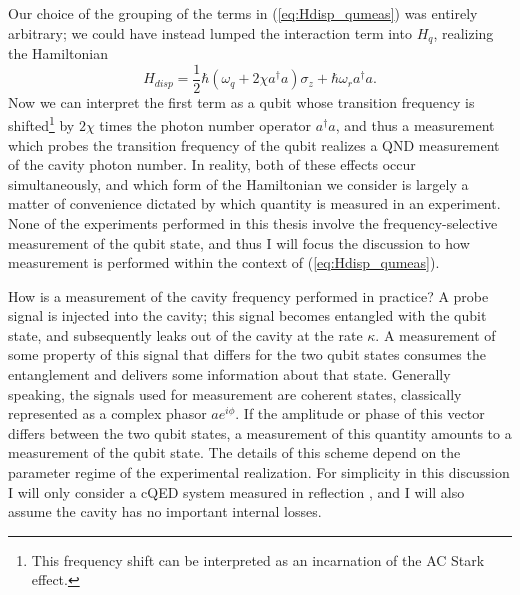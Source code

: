 Our choice of the grouping of the terms in (\ref{eq:Hdisp_qumeas}) was entirely arbitrary; we could have instead lumped the interaction term into $H_q$, realizing the Hamiltonian
\begin{equation}
H_{disp} = \frac{1}{2} \hbar (\omega_q + 2 \chi a^\dagger a)  \sigma_z + \hbar \omega_r a^\dagger a.
\label{eq:Hdisp_cavmeas}
\end{equation}
Now we can interpret the first term as a qubit whose transition frequency is shifted\footnote{This frequency shift can be interpreted as an incarnation of the AC Stark effect.} by $2 \chi$ times the photon number operator $a^\dagger a$, and thus a measurement which probes the transition frequency of the qubit realizes a QND measurement of the cavity photon number.  In reality, both of these effects occur simultaneously, and which form of the Hamiltonian we consider is largely a matter of convenience dictated by which quantity is measured in an experiment.  None of the experiments performed in this thesis involve the frequency-selective measurement of the qubit state, and thus I will focus the discussion to how measurement is performed within the context of (\ref{eq:Hdisp_qumeas}).

How is a measurement of the cavity frequency performed in practice?  A probe signal is injected into the cavity; this signal becomes entangled with the qubit state, and subsequently leaks out of the cavity at the rate $\kappa$.  A measurement of some property of this signal that differs for the two qubit states consumes the entanglement and delivers some information about that state.  Generally speaking, the signals used for measurement are coherent states, classically represented as a complex phasor $a e^{i \phi}$.   If the amplitude or phase of this vector differs between the two qubit states, a measurement of this quantity amounts to a measurement of the qubit state.  The details of this scheme depend on the parameter regime of the experimental realization.  For simplicity in this discussion I will only consider a cQED system measured in reflection \cite{Boissonneault2009,Girvin2014}, and I will also assume the cavity has no important internal losses.

